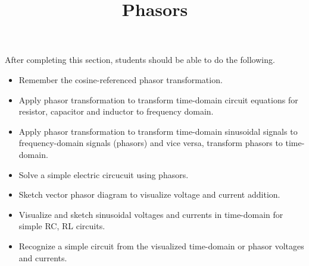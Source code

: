 \documentclass{ximera}
\title{Phasors}
\begin{document}
\begin{abstract}
\end{abstract}

\maketitle

\begin{sectionOutcomes}

After completing this section, students should be able to do the following.

\begin{itemize}
\item Remember the cosine-referenced phasor transformation.
\item Apply phasor transformation to transform time-domain circuit equations for resistor, capacitor and inductor to frequency domain.
\item Apply phasor transformation to transform time-domain sinusoidal signals to frequency-domain signals (phasors) and vice versa, transform phasors to time-domain.
\item Solve a simple electric circucuit using phasors.
\item Sketch vector phasor diagram to visualize voltage and current addition.
\item Visualize and sketch sinusoidal voltages and currents  in time-domain for simple RC, RL circuits.
\item Recognize a simple circuit from the visualized time-domain  or phasor voltages and currents.
\end{itemize}

\end{sectionOutcomes}
\end{document}
